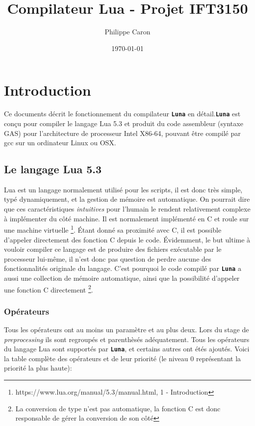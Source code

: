\documentclass{article}
\title{Compilateur Lua - Projet IFT3150}
\date{\today}
\author{Philippe Caron}
\newcommand{\luna}{\textbf{\texttt{Luna}}}
\begin{document}
\maketitle
\tableofcontents
\newpage
\section{Introduction}
Ce documents décrit le fonctionnement du compilateur \luna{} en détail.\luna{} est conçu pour compiler le langage Lua 5.3 et produit du code assembleur (syntaxe GAS) pour l'architecture de processeur Intel X86-64, pouvant être compilé par gcc sur un ordinateur Linux ou OSX.

\subsection{Le langage Lua 5.3}
Lua est un langage normalement utilisé pour les scripts, il est donc très simple, typé dynamiquement, et la gestion de mémoire est automatique. On pourrait dire que ces caractéristiques \textit{intuitives} pour l'humain le rendent relativement complexe à implémenter du côté machine. Il est normalement implémenté en C et roule sur une machine virtuelle \footnote{https://www.lua.org/manual/5.3/manual.html, 1 - Introduction}. Étant donné sa proximité avec C, il est possible d'appeler directement des fonction C depuis le code. Évidemment, le but ultime à vouloir compiler ce langage est de produire des fichiers exécutable par le processeur lui-même, il n'est donc pas question de perdre aucune des fonctionnalités originale du langage. C'est pourquoi le code compilé par \luna{} a aussi une collection de mémoire automatique, ainsi que la possibilité d'appeler une fonction C directement \footnote{La conversion de type n'est pas automatique, la fonction C est donc responsable de gérer la conversion de son côté}.

\subsubsection{Opérateurs}
Tous les opérateurs ont au moins un paramètre et au plus deux. Lors du stage de \textit{preprocessing} ils sont regroupés et parenthèsés adéquatement.
Tous les opérateurs du langage Lua sont supportés par \luna{}, et certains autres ont étés ajoutés. Voici la table complète des opérateurs et de leur priorité (le niveau 0 représentant la priorité la plus haute):
\end{document}
